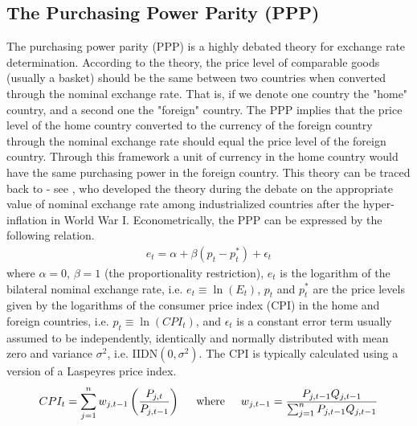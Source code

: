 \documentclass[10pt]{article}
\numberwithin{equation}{section}
\numberwithin{table}{section}
\numberwithin{figure}{section}
\begin{document}
\begin{spacing}{1.5}
\subsection{The Purchasing Power Parity (PPP)}
\label{subsec:PPP}
\noindent The purchasing power parity (PPP) is a highly debated theory for exchange rate determination. According to the theory, the price level of comparable goods (usually a basket) should be the same between two countries when converted through the nominal exchange rate. That is, if we denote one country the "home" country, and a second one the "foreign" country. The PPP implies that the price level of the home country converted to the currency of the foreign country through the nominal exchange rate should equal the price level of the foreign country. Through this framework a unit of currency in the home country would have the same purchasing power in the foreign country. This theory can be traced back to \cite{cassel1918abnormal} - see \cite{rossi2013exchange}, who developed the theory during the debate on the appropriate value of nominal exchange rate among industrialized countries after the hyper-inflation in World War I. Econometrically, the PPP can be expressed by the following relation.
\begin{align}
e_t = \alpha + \beta\left(p_t - p_t^* \right) + \epsilon_t
\label{eq:4}
\end{align}
 where $\alpha=0$, $\beta=1$ (the proportionality restriction), $e_t$ is the logarithm of the bilateral nominal exchange rate, i.e. $e_t \equiv \ln\left(E_t\right) $, $p_t$ and $p_t^*$ are the price levels given by the logarithms of the consumer price index (CPI) in the home and foreign countries, i.e. $p_t \equiv \ln \left(CPI_t \right)$, and $\epsilon_t$ is a constant error term usually assumed to be independently, identically and normally distributed with mean zero and variance $\sigma^2$, i.e. IIDN$\left(0, \sigma^2 \right)$. The CPI is typically calculated using a version of a Laspeyres price index. 
\begin{align}
    CPI_t = \sum_{j=1}^n w_{j,t-1} \left(\frac{P_{j,t}}{P_{j,t-1}} \right)\hspace*{0,5cm}\text{where}\hspace{0,5cm}w_{j,t-1} = \frac{P_{j,t-1}Q_{j,t-1}}{\sum_{j=1}^nP_{j,t-1}Q_{j,t-1}}
    \label{eq:5}
\end{align}

\end{spacing}
\end{document}
